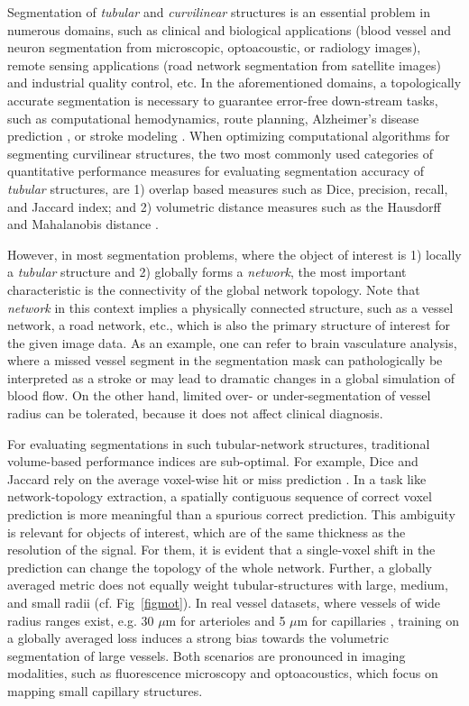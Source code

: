 Segmentation of \textit{tubular} and \textit{curvilinear} structures is an essential problem in numerous domains, such as clinical and biological applications (blood vessel and neuron segmentation from microscopic, optoacoustic, or radiology images), remote sensing applications (road network segmentation from satellite images) and industrial quality control, etc. In the aforementioned domains, a topologically accurate segmentation is necessary to guarantee error-free down-stream tasks, such as computational hemodynamics, route planning, Alzheimer's disease prediction \cite{hunter2012morphological}, or stroke modeling \cite{joutel2010cerebrovascular}. When optimizing computational algorithms for segmenting curvilinear structures, the two most commonly used categories of quantitative performance measures for evaluating segmentation accuracy of \textit{tubular} structures, are 1) overlap based measures such as Dice, precision, recall, and Jaccard index; and 2) volumetric distance measures such as the Hausdorff and Mahalanobis distance \cite{kirbas2004review,schneider2015joint,phellan2017vascular,hu2018retinal}.

However, in most segmentation problems, where the object of interest is 1) locally a \textit{tubular} structure and 2) globally forms a \textit{network}, the most important characteristic is the connectivity of the global network topology. Note that \textit{network} in this context implies a physically connected structure, such as a vessel network, a road network, etc., which is also the primary structure of interest for the given image data. As an example, one can refer to brain vasculature analysis, where a missed vessel segment in the segmentation mask can pathologically be interpreted as a stroke or may lead to dramatic changes in a global simulation of blood flow. On the other hand, limited over- or under-segmentation of vessel radius can be tolerated, because it does not affect clinical diagnosis.

For evaluating segmentations in such tubular-network structures, traditional volume-based performance indices are sub-optimal. For example, Dice and Jaccard rely on the average voxel-wise hit or miss prediction \cite{taha2015metrics}. In a task like network-topology extraction, a spatially contiguous sequence of correct voxel prediction is more meaningful than a spurious correct prediction. This ambiguity is relevant for objects of interest, which are of the same thickness as the resolution of the signal. For them, it is evident that a single-voxel shift in the prediction can change the topology of the whole network. Further, a globally averaged metric does not equally weight tubular-structures with large, medium, and small radii (cf. Fig~\ref{figmot}). In real vessel datasets, where vessels of wide radius ranges exist, e.g. 30 $\mu$m for arterioles and 5 $\mu$m for capillaries \cite{todorov2019automated,di2018whole}, training on a globally averaged loss induces a strong bias towards the volumetric segmentation of large vessels. Both scenarios are pronounced in imaging modalities, such as fluorescence microscopy \cite{todorov2019automated,zhao2020cellular} and optoacoustics, which focus on mapping small capillary structures. 

